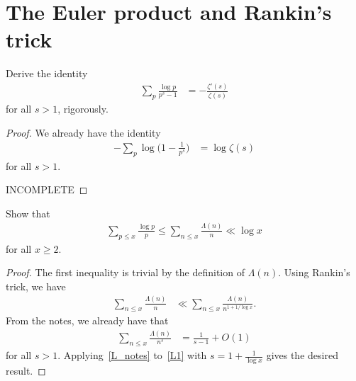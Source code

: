\documentclass[11pt]{article}
\newenvironment{ex}[1]
  {\renewcommand\theinnercustomthm{#1}\innercustomthm}
  {\endinnercustomthm}
\begin{document}

\section{The Euler product and Rankin's trick}


\begin{ex}{16}\label{sixteen}
Derive the identity
\begin{align}
\sum_p\frac{\log{p}}{p^s-1} &= -\frac{\zeta'(s)}{\zeta(s)}
\end{align}
for all $s>1$, rigorously.
\end{ex}

\begin{proof}
We already have the identity
\begin{align}
-\sum_p\log{\bigg(1-\frac{1}{p^s}\bigg)} &= \log{\zeta(s)}\label{log_zeta}
\end{align}
for all $s>1$.

INCOMPLETE
\end{proof}


\begin{ex}{17}\label{seventeen}
Show that
\begin{align*}
\sum_{p\leq x}\frac{\log{p}}{p} \leq \sum_{n\leq x}\frac{\Lambda(n)}{n} \ll \log{x}
\end{align*}
for all $x\geq 2$.
\end{ex}

\begin{proof}
The first inequality is trivial by the definition of $\Lambda(n)$. Using Rankin's trick, we have
\begin{align}
\sum_{n\leq x}\frac{\Lambda(n)}{n} &\ll \sum_{n\leq x}\frac{\Lambda(n)}{n^{1+1/\log{x}}}.\label{L1}
\end{align}
From the notes, we already have that 
\begin{align}
\sum_{n\leq x}\frac{\Lambda(n)}{n^s} &= \frac{1}{s-1}+O(1)\label{L_notes}
\end{align}
for all $s>1$. Applying~\eqref{L_notes} to~\eqref{L1} with $s = 1+\frac{1}{\log{x}}$ gives the desired result.
\end{proof}
\end{document}

